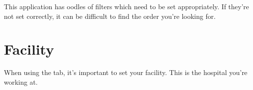 This application has oodles of filters which need to be set appropriately. If they're not set correctly, it can be difficult to find the order you're looking for.

\section{Facility}

When using the  tab, it's important to set your facility. This is the hospital you're working at.

